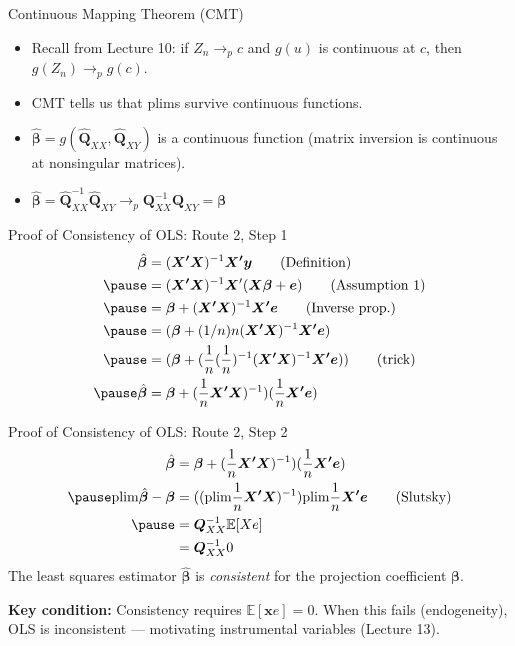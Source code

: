 \documentclass[aspectratio=169, handout, t]{beamer}
\numberwithin{equation}{section}
\begin{document}
\begin{frame}{Continuous Mapping Theorem (CMT)}
\begin{itemize}
\item Recall from Lecture 10: if $Z_n\rightarrow_p c$ and $g(u)$ is continuous at $c$, then $g(Z_n)\rightarrow_p g(c)$.\pause
\item CMT tells us that plims survive continuous functions.\pause
\item $\hat{\bm{\beta}}=g(\hat{\bm{Q}}_{XX}, \hat{\bm{Q}}_{XY})$ is a continuous function (matrix inversion is continuous at nonsingular matrices).\pause
\item $\hat{\bm{\beta}}=\hat{\bm{Q}}_{XX}^{-1}\hat{\bm{Q}}_{XY}\rightarrow_p \bm{Q}_{XX}^{-1}\bm{Q}_{XY}=\bm{\beta}$
\end{itemize}
\end{frame}


\begin{frame}{Proof of Consistency of OLS: Route 2, Step 1}
\begin{align*}
\hat{\bm{\beta}}&=(\bm{X'X})^{-1}\bm{X'y} \tag{Definition}\\ \pause
&=(\bm{X'X})^{-1}\bm{X}'(\bm{X}\bm{\beta}+\bm{e}) \tag{Assumption 1}\\  \pause
&=\bm{\beta}+(\bm{X'X})^{-1}\bm{X'e} \tag{Inverse prop.}\\  \pause
&=(\bm{\beta}+(1/n)n(\bm{X'X})^{-1}\bm{X'e}) \\ \pause
&=(\bm{\beta}+(\frac{1}{n}(\frac{1}{n})^{-1}(\bm{X'X})^{-1}\bm{X'e})) \tag{trick}\\ \pause
\hat{\bm{\beta}}&=\bm{\beta}+(\frac{1}{n}\bm{X'X})^{-1}) ( \frac{1}{n}\bm{X'e})
\end{align*}
 \end{frame}


\begin{frame}{Proof of Consistency of OLS: Route 2, Step 2}
\begin{align*}
\hat{\bm{\beta}}&=\bm{\beta}+(\frac{1}{n}\bm{X'X})^{-1}) ( \frac{1}{n}\bm{X'e}) \\ \pause
\text{plim}\hat{\bm{\beta}}-\bm{\beta}&=((\text{plim}\frac{1}{n}\bm{X'X})^{-1}) \text{plim} \frac{1}{n}\bm{X'e} \tag{Slutsky}\\ \pause
&=\bm{Q}_{XX}^{-1} \mathbb{E}[Xe]\\
&=\bm{Q}_{XX}^{-1} 0
\end{align*}
The least squares estimator $\hat{\bm{\beta}}$ is \emph{consistent} for the projection coefficient $\bm{\beta}$.

\pause

\begin{tcolorbox}[colback=blue!5, colframe=blue!50]
\textbf{Key condition:} Consistency requires $\mathbb{E}[\bm{x}e] = 0$. When this fails (endogeneity), OLS is inconsistent --- motivating instrumental variables (Lecture 13).
\end{tcolorbox}

 \end{frame}
\end{document}
